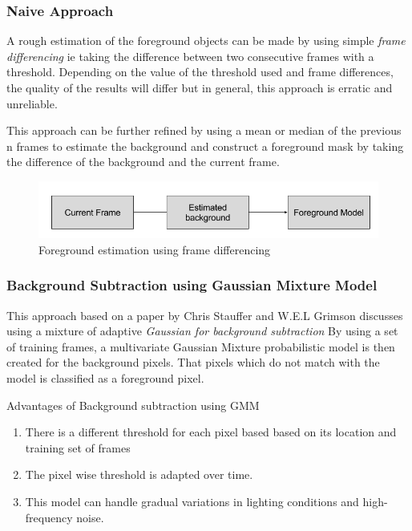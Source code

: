 \documentclass{article}
\begin{document}
	\subsubsection{Naive Approach}
	A rough estimation of the foreground objects can be made by using simple \textit{frame differencing} ie taking the difference between two consecutive frames with a threshold. Depending on the value of the threshold used and frame differences, the quality of the results will differ but in general, this approach is erratic and unreliable. 
	
	This approach can be further refined by using a mean or median of the previous n frames to estimate the background and construct a foreground mask by taking the difference of the background and the current frame. 
	
	\begin{figure}
		\centering
		\includegraphics[scale = 0.4]{figures/naive_fd.png}
		\caption{Foreground estimation using frame differencing}
	\end{figure}
	
	\subsubsection{Background Subtraction using Gaussian Mixture Model}
	 
	This approach based on a paper by Chris Stauffer and W.E.L Grimson discusses using a mixture of adaptive \textit{Gaussian for background subtraction} By using a set of training frames, a multivariate Gaussian Mixture probabilistic model is then created for the background pixels. That pixels which do not match with the model is classified as a foreground pixel.
	
	Advantages of Background subtraction using GMM
	
	\begin{enumerate}
		\item There is a different threshold for each pixel based based on its location and training set of frames
		\item The pixel wise threshold is adapted over time.
		\item This model can handle gradual variations in lighting conditions and high-frequency noise.
	\end{enumerate}
\end{document}

